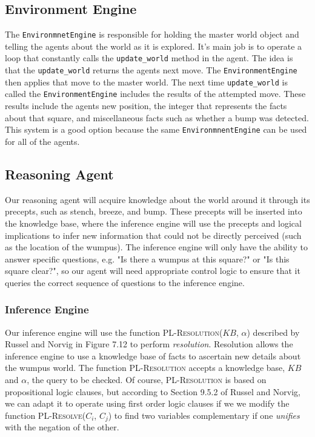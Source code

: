 \documentclass{article}
\begin{document}
		\subsection{Environment Engine}
		The \texttt{EnvironmnetEngine} is responsible for holding the master world object and  telling the agents about the world as it is explored.
		It's main job is to operate a loop that constantly calls the \texttt{update\_world} method in the agent. 
		The idea is that the \texttt{update\_world} returns the agents next move. 
		The \texttt{EnvironmentEngine} then applies that move to the master world.
		The next time \texttt{update\_world} is called the \texttt{EnvironmentEngine} includes the results of the attempted move.
		These results include the agents new position, the integer that represents the facts about that square, and miscellaneous facts such as whether a bump was detected. 
		This system is a good option because the same \texttt{EnvironmnentEngine} can be used for all of the agents. 
		\subsection{Reasoning Agent}
		\label{reason}
		
			Our reasoning agent will acquire knowledge about the world around it through its precepts, such as stench, breeze, and bump. These precepts will be inserted into the knowledge base, where the inference engine will use the precepts and logical implications to infer new information that could not be directly perceived (such as the location of the wumpus). The inference engine will only have the ability to answer specific questions, e.g. "Is there a wumpus at this square?" or "Is this square clear?", so our agent will need appropriate control logic to ensure that it queries the correct sequence of questions to the inference engine.  
		
			\subsubsection{Inference Engine}
			\label{inference}
			
				Our inference engine will use the function \textsc{PL-Resolution}($KB$, $\alpha$) described by Russel and Norvig in Figure 7.12 \cite{ai} to perform \textit{resolution}. 
				Resolution allows the inference engine to use a knowledge base of facts to ascertain new details about the wumpus world. 
				The function \textsc{PL-Resolution} accepts a knowledge base, $KB$ and $\alpha$, the query to be checked. Of course, \textsc{PL-Resolution} is based on propositional logic clauses, but according to Section 9.5.2 of Russel and Norvig, we can adapt it to operate using first order logic clauses if we we modify the function \textsc{PL-Resolve($C_i$, $C_j$)} to find two variables complementary if one \textit{unifies} with the negation of the other. 
				
\end{document}
